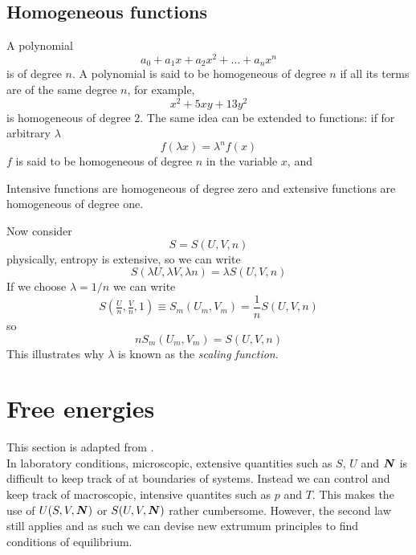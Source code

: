 \subsection{Homogeneous functions}
\label{homofun}
A polynomial
\begin{equation}
  a_0+a_1x+a_2x^2+\dots+a_nx^n
\end{equation}
is of degree $n$. A polynomial is said to be homogeneous of degree $n$ if all its terms are of the same degree $n$, for example,
\begin{equation}
  x^2+5xy+13y^2
\end{equation}
is homogeneous of degree $2$. The same idea can be extended to functions: if for arbitrary $\lambda$
\begin{equation}
  f(\lambda x)=\lambda^nf(x)
\end{equation}
$f$ is said to be homogeneous of degree $n$ in the variable $x$, and
\begin{defi}
Intensive functions are homogeneous of degree zero and extensive functions are homogeneous of degree one.
\end{defi}
Now consider 
\begin{equation}
  S=S(U,V,n)
\end{equation}
physically, entropy is extensive, so we can write
\begin{equation}
  S(\lambda U,\lambda V,\lambda n)=\lambda S(U,V,n)
\end{equation}
If we choose $\lambda=1/n$ we can write
\begin{equation}
  S(\tfrac{U}{n},\tfrac{V}{n},1)\equiv S_m(U_m,V_m)=\frac{1}{n}S(U,V,n)
\end{equation}
so
\begin{equation}
  nS_m(U_m,V_m)=S(U,V,n)
\end{equation}
This illustrates why $\lambda$ is known as the \emph{scaling function}.

\section{Free energies}
\label{free_energy}
This section is adapted from \cite{dill}. \\
In laboratory conditions, microscopic, extensive quantities such as $S$, $U$ and $\boldsymbol{N}$ is difficult to keep track of at boundaries of systems. 
Instead we can control and keep track of macroscopic, intensive quantites such as $p$ and $T$. 
This makes the use of $U(S,V,\boldsymbol{N})$ or $S(U,V,\boldsymbol{N})$ rather cumbersome. 
However, the second law still applies and as such we can devise new extrumum principles to find conditions of equilibrium. 


